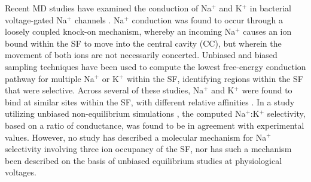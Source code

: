 \begin{refsection}
Recent MD studies have examined the conduction of Na$^+$ and K$^+$ in bacterial voltage-gated Na$^+$ channels \cite{Boiteux:2014ut,Corry:2012ge,Domene:2015kj, FinolUrdaneta:2014bz,Furini:2012jl,Ngo:2016es,Ulmschneider:2013da,Chakrabarti:2013kd}. Na$^+$ conduction was found to occur through a loosely coupled knock-on mechanism, whereby an incoming Na$^+$ causes an ion bound within the SF to move into the central cavity (CC), but wherein the movement of both ions are not necessarily concerted. Unbiased and biased sampling techniques have been used to compute the lowest free-energy conduction pathway for multiple Na$^+$ or K$^+$ within the SF, identifying regions within the SF that were selective. Across several of these studies, Na$^+$ and K$^+$ were found to bind at similar sites within the SF, with different relative affinities \cite{Ing:2016em}. In a study utilizing unbiased non-equilibrium simulations \cite{Ulmschneider:2013da}, the computed Na$^+$:K$^+$ selectivity, based on a ratio of conductance, was found to be in agreement with experimental values. However, no study has described a molecular mechanism for Na$^+$ selectivity involving three ion occupancy of the SF, nor has such a mechanism been described on the basis of unbiased equilibrium studies at physiological voltages. 


\end{refsection}
